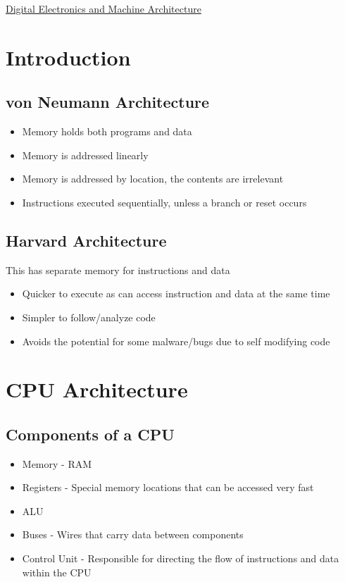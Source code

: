 \documentclass{article}[18pt]
\begin{document}
\begin{center}
\underline{\huge Digital Electronics and Machine Architecture}
\end{center}
\section{Introduction}
\subsection{von Neumann Architecture}
\begin{itemize}
	\item Memory holds both programs and data
	\item Memory is addressed linearly
	\item Memory is addressed by location, the contents are irrelevant
	\item Instructions executed sequentially, unless a branch or reset occurs
\end{itemize}
\subsection{Harvard Architecture}
This has separate memory for instructions and data
\begin{itemize}
	\item Quicker to execute as can access instruction and data at the same time
	\item Simpler to follow/analyze code
	\item Avoids the potential for some malware/bugs due to self modifying code
\end{itemize}
\section{CPU Architecture}
\subsection{Components of a CPU}
\begin{itemize}
	\item Memory - RAM
	\item Registers - Special memory locations that can be accessed very fast
	\item ALU
	\item Buses - Wires that carry data between components
	\item Control Unit - Responsible for directing the flow of instructions and data within the CPU
\end{itemize}
\end{document}

